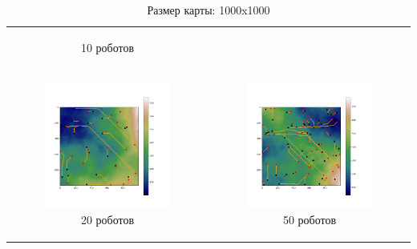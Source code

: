 \documentclass{article}
\begin{document}
\begin{table}[H]
\begin{tabular}{c c}
\begin{subfigure}{0.5\linewidth}
			\caption*{10 роботов}
			\end{subfigure}
			\\
            \begin{subfigure}{0.5\linewidth}
				\includegraphics[width = 1.0\columnwidth]{data/mean_paths/1000x1000/20.png}
			\caption*{20 роботов}
			\end{subfigure}
			&
			\begin{subfigure}{0.5\linewidth}
				\includegraphics[width = 1.0\columnwidth]{data/mean_paths/1000x1000/50.png}
			\caption*{50 роботов}
			\end{subfigure}
        \end{tabular}
        \caption*{Размер карты: 1000x1000}
	\end{table}
\end{document}
